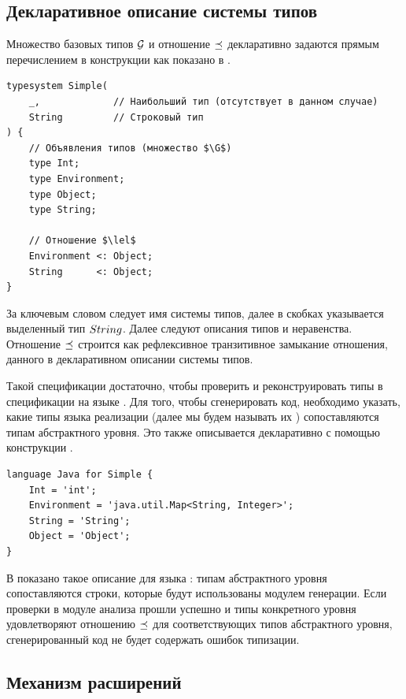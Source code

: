 \subsection{Декларативное описание системы типов}

Множество базовых типов ${\mathcal{G}_{}}$ и отношение $\preceq_{}$ декларативно задаются прямым перечислением в конструкции  как показано в . 
\begin{lstlisting}[language=Typesystem,label=typesystem,float=htbp,
caption=Декларативное описание типов абстрактного уровня]
typesystem Simple( 
	_,             // Наибольший тип (отсутствует в данном случае)
	String         // Строковый тип
) {
	// Объявления типов (множество $\G$)
	type Int;
	type Environment;
	type Object;
	type String;

	// Отношение $\lel$
	Environment <: Object;
	String      <: Object;
}
\end{lstlisting}
За ключевым словом  следует имя системы типов, далее в скобках указывается выделенный тип $String_{}$. Далее следуют описания типов и неравенства. Отношение $\preceq_{}$ строится как рефлексивное транзитивное замыкание отношения, данного в декларативном описании системы типов.

Такой спецификации достаточно, чтобы проверить и реконструировать типы в спецификации на языке \ATF{}. Для того, чтобы сгенерировать код, необходимо указать, какие типы языка реализации (далее мы будем называть их ) сопоставляются типам абстрактного уровня. Это также описывается декларативно с помощью конструкции . 
\begin{lstlisting}[language=Typesystem,label=language,float=htbp,
caption=Декларативное описание типов конкретного уровня]
language Java for Simple {
	Int = 'int';
	Environment = 'java.util.Map<String, Integer>';
	String = 'String';
	Object = 'Object';
}
\end{lstlisting}
В   показано такое описание для языка : типам абстрактного уровня сопоставляются строки, которые будут использованы модулем генерации. Если проверки в модуле анализа прошли успешно и типы конкретного уровня удовлетворяют отношению $\preceq_{}$ для соответствующих типов абстрактного уровня, сгенерированный код не будет содержать ошибок типизации.

\subsection{Механизм расширений}


